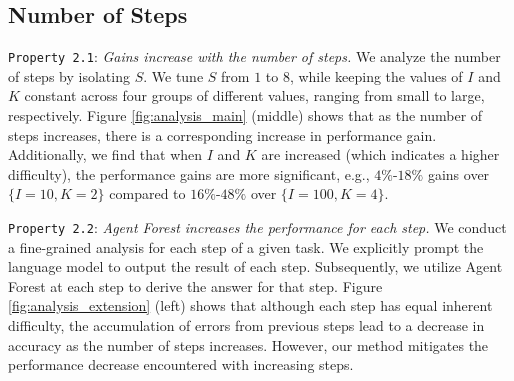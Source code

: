 \subsection{Number of Steps}
\texttt{Property 2.1}: \textit{Gains increase with the number of steps.} 
We analyze the number of steps by isolating $S$. We tune $S$ from $1$ to $8$, while keeping the values of $I$ and $K$ constant across four groups of different values, ranging from small to large, respectively. Figure \ref{fig:analysis_main} (middle) shows that as the number of steps increases, there is a corresponding increase in performance gain. Additionally, we find that when $I$ and $K$ are increased (which indicates a higher difficulty), the performance gains are more significant, e.g., $4\%$-$18\%$ gains over $\{I=10, K=2\}$ compared to $16\%$-$48\%$ over $\{I=100, K=4\}$.


\texttt{Property 2.2}: \textit{Agent Forest increases the performance for each step.} We conduct a fine-grained analysis for each step of a given task. We explicitly prompt the language model to output the result of each step. Subsequently, we utilize Agent Forest at each step to derive the answer for that step. Figure \ref{fig:analysis_extension} (left) shows that although each step has equal inherent difficulty, the accumulation of errors from previous steps lead to a decrease in accuracy as the number of steps increases. However, our method mitigates the performance decrease encountered with increasing steps.



